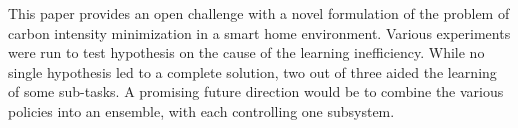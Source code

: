 This paper provides an open challenge with a novel formulation of the problem of carbon intensity minimization in a smart home environment. Various experiments were run to test hypothesis on the cause of the learning inefficiency. While no single hypothesis led to a complete solution, two out of three aided the learning of some sub-tasks. A promising future direction would be to combine the various policies into an ensemble, with each controlling one subsystem. 
